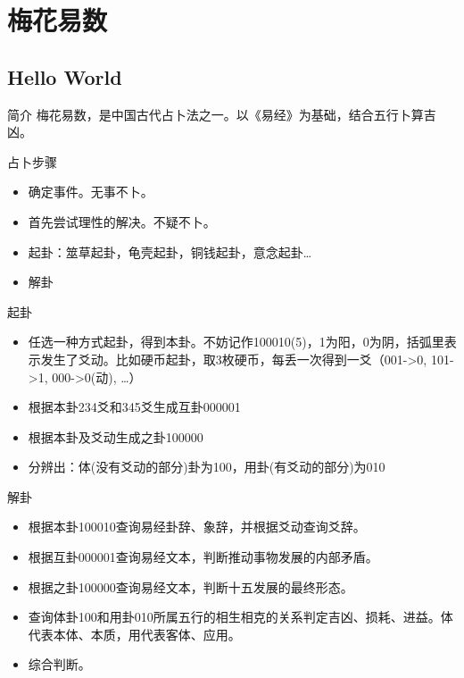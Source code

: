 \documentclass{beamer}
\begin{document}
\section{梅花易数}
\subsection{Hello World} 
  \begin{frame}{简介}
    梅花易数，是中国古代占卜法之一。以《易经》为基础，结合五行卜算吉凶。
  \end{frame}
  \begin{frame}{占卜步骤}
    \begin{itemize}
      \item 确定事件。无事不卜。
      \item 首先尝试理性的解决。不疑不卜。
      \item 起卦：筮草起卦，龟壳起卦，铜钱起卦，意念起卦\ldots
      \item 解卦
    \end{itemize}
  \end{frame}
  \begin{frame}{起卦}
    \begin{itemize}
      \item 任选一种方式起卦，得到本卦。不妨记作100010(5)，1为阳，0为阴，括弧里表示发生了爻动。比如硬币起卦，取3枚硬币，每丢一次得到一爻（001->0, 101->1, 000->0(动), \ldots）
      \item 根据本卦234爻和345爻生成互卦000001
      \item 根据本卦及爻动生成之卦100000
      \item 分辨出：体(没有爻动的部分)卦为100，用卦(有爻动的部分)为010
    \end{itemize}
  \end{frame}
  \begin{frame}{解卦}
    \begin{itemize}
      \item 根据本卦100010查询易经卦辞、象辞，并根据爻动查询爻辞。
      \item 根据互卦000001查询易经文本，判断推动事物发展的内部矛盾。
      \item 根据之卦100000查询易经文本，判断十五发展的最终形态。
      \item 查询体卦100和用卦010所属五行的相生相克的关系判定吉凶、损耗、进益。体代表本体、本质，用代表客体、应用。
      \item 综合判断。
    \end{itemize}
  \end{frame}
\end{document}
